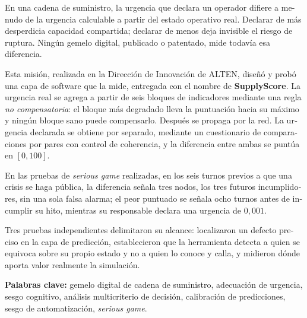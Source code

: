 \begin{otherlanguage}{spanish}
En una cadena de suministro, la urgencia que declara un operador difiere a menudo de la
urgencia calculable a partir del estado operativo real. Declarar de m\'as desperdicia
capacidad compartida; declarar de menos deja invisible el riesgo de ruptura. Ning\'un gemelo
digital, publicado o patentado, mide todav\'ia esa diferencia.

Esta misi\'on, realizada en la Direcci\'on de Innovaci\'on de ALTEN, dise\~n\'o y prob\'o una
capa de software que la mide, entregada con el nombre de \textbf{SupplyScore}. La urgencia
real se agrega a partir de seis bloques de
indicadores mediante una regla \emph{no compensatoria}: el bloque m\'as degradado lleva la
puntuaci\'on hacia su m\'aximo y ning\'un bloque sano puede compensarlo. Despu\'es se propaga
por la red. La urgencia declarada se obtiene por separado, mediante un cuestionario de
comparaciones por pares con control de coherencia, y la diferencia entre ambas se punt\'ua en
$[0,100]$.

En las pruebas de \emph{serious game} realizadas, en los seis turnos previos a que una crisis
se haga p\'ublica, la diferencia se\~nala tres nodos, los tres futuros incumplidores, sin una
sola falsa alarma; el peor puntuado se se\~nala ocho turnos antes de incumplir su hito,
mientras su responsable declara una urgencia de $0{,}001$.

Tres pruebas independientes delimitaron su alcance: localizaron un defecto preciso en la capa
de predicci\'on, establecieron que la herramienta detecta a quien se equivoca sobre su propio
estado y no a quien lo conoce y calla, y midieron d\'onde aporta valor realmente la
simulaci\'on.

\medskip

\noindent\textbf{Palabras clave:} gemelo digital de cadena de suministro, adecuaci\'on de
urgencia, sesgo cognitivo, an\'alisis multicriterio de decisi\'on, calibraci\'on de
predicciones, sesgo de automatizaci\'on, \emph{serious game}.
\end{otherlanguage}
